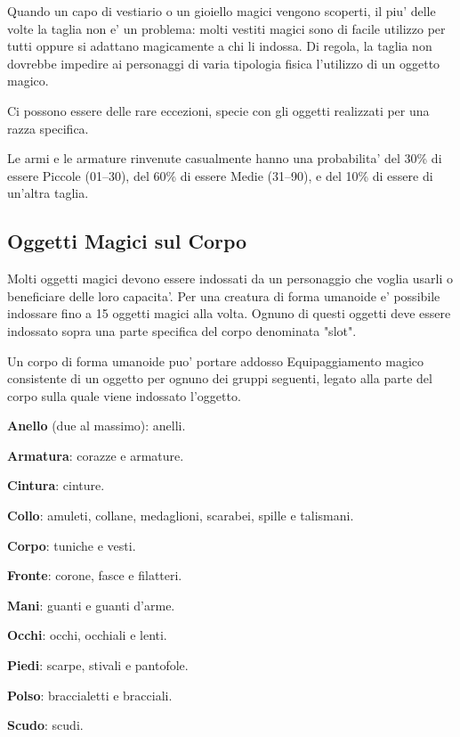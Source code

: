 \documentclass[a4paper,11pt,twoside,openany]{book}
\begin{document}
{\label{taglia-e-oggetti-magici}

Quando un capo di vestiario o un gioiello magici vengono scoperti, il piu' delle volte la taglia non e' un problema: molti vestiti magici sono di facile utilizzo per tutti oppure si adattano magicamente a chi li indossa. Di regola, la taglia non dovrebbe impedire ai personaggi di varia tipologia fisica l'utilizzo di un oggetto magico. 

Ci possono essere delle rare eccezioni, specie con gli oggetti realizzati per una razza specifica.

Le armi e le armature rinvenute casualmente hanno una probabilita' del 30\% di essere Piccole (01--30), del 60\% di essere Medie (31--90), e del 10\% di essere di un'altra taglia.

\subsection{Oggetti Magici sul Corpo}

\label{oggetti-magici-sul-corpo}

Molti oggetti magici devono essere indossati da un personaggio che voglia usarli o beneficiare delle loro capacita'. Per una creatura di forma umanoide e' possibile indossare fino a 15 oggetti magici alla volta. Ognuno di questi oggetti deve essere indossato sopra una parte specifica del corpo denominata "slot".

Un corpo di forma umanoide puo' portare addosso Equipaggiamento magico consistente di un oggetto per ognuno dei gruppi seguenti, legato alla parte del corpo sulla quale viene indossato l'oggetto.

\textbf{Anello} (due al massimo): anelli.

\textbf{Armatura}: corazze e armature.

\textbf{Cintura}: cinture.

\textbf{Collo}: amuleti, collane, medaglioni, scarabei, spille e talismani.

\textbf{Corpo}: tuniche e vesti.

\textbf{Fronte}: corone, fasce e filatteri.

\textbf{Mani}: guanti e guanti d'arme.

\textbf{Occhi}: occhi, occhiali e lenti.

\textbf{Piedi}: scarpe, stivali e pantofole.

\textbf{Polso}: braccialetti e bracciali.

\textbf{Scudo}: scudi.

}
\end{document}

